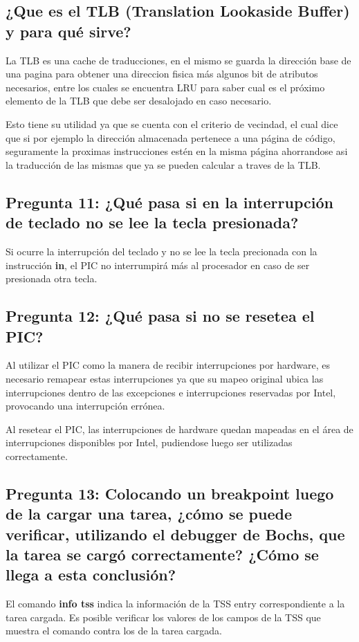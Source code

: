 \documentclass[a4paper,10pt,twoside]{article}
\begin{document}
\subsection{¿Que es el TLB (Translation Lookaside Buffer) y para qué sirve?}

La TLB es una cache de traducciones, en el mismo se guarda la dirección base de una pagina para obtener una direccion fisica más algunos bit de atributos necesarios, entre los cuales se encuentra LRU para saber cual es el próximo elemento de la TLB que debe ser desalojado en caso necesario.

Esto tiene su utilidad ya que se cuenta con el criterio de vecindad, el cual dice que si por ejemplo la dirección almacenada pertenece a una página de código, seguramente la proximas instrucciones estén en la misma página ahorrandose asi la traducción de las mismas que ya se pueden calcular a traves de la TLB. 


\subsection{Pregunta 11: ¿Qué pasa si en la interrupción de teclado no se lee la tecla presionada?}
Si ocurre la interrupción del teclado y no se lee la tecla precionada con la instrucción \textbf{in}, el PIC no interrumpirá más al procesador en caso de ser presionada otra tecla.

\subsection{Pregunta 12: ¿Qué pasa si no se resetea el PIC?}
Al utilizar el PIC como la manera de recibir interrupciones por hardware, es necesario remapear estas interrupciones ya que su mapeo original ubica las interrupciones dentro de las excepciones e interrupciones reservadas por Intel, provocando una interrupción errónea.

Al resetear el PIC, las interrupciones de hardware quedan mapeadas en el área de interrupciones disponibles por Intel, pudiendose luego ser utilizadas correctamente.

\subsection{Pregunta 13: Colocando un breakpoint luego de la cargar una tarea, ¿cómo se puede
verificar, utilizando el debugger de Bochs, que la tarea se cargó correctamente? ¿Cómo se
llega a esta conclusión?}
El comando \textbf{info tss} indica la información de la TSS entry correspondiente a la tarea cargada. Es posible verificar los valores de los campos de la TSS que muestra el comando contra los de la tarea cargada. 
\end{document}
